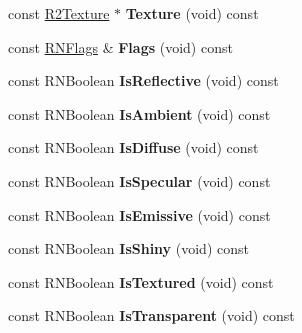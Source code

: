 \begin{DoxyCompactItemize}
\item 
const \hyperlink{class_r2_texture}{R2\+Texture} $\ast$ {\bfseries Texture} (void) const \hypertarget{class_r3_material_adb3b9725fc7ff3e0daf1f5e89dff8658}{}\label{class_r3_material_adb3b9725fc7ff3e0daf1f5e89dff8658}

\item 
const \hyperlink{class_r_n_flags}{R\+N\+Flags} \& {\bfseries Flags} (void) const \hypertarget{class_r3_material_a0348d7a761c37a72bcb7c214f095073b}{}\label{class_r3_material_a0348d7a761c37a72bcb7c214f095073b}

\item 
const R\+N\+Boolean {\bfseries Is\+Reflective} (void) const \hypertarget{class_r3_material_acf58b1ee4d1a08b066955d59c138cb70}{}\label{class_r3_material_acf58b1ee4d1a08b066955d59c138cb70}

\item 
const R\+N\+Boolean {\bfseries Is\+Ambient} (void) const \hypertarget{class_r3_material_a82a247481e72713014ac9f94fe27c7f7}{}\label{class_r3_material_a82a247481e72713014ac9f94fe27c7f7}

\item 
const R\+N\+Boolean {\bfseries Is\+Diffuse} (void) const \hypertarget{class_r3_material_a10a6578179e33218ffa010294fc1e88f}{}\label{class_r3_material_a10a6578179e33218ffa010294fc1e88f}

\item 
const R\+N\+Boolean {\bfseries Is\+Specular} (void) const \hypertarget{class_r3_material_a32a006663fe467228e13abf3c231383b}{}\label{class_r3_material_a32a006663fe467228e13abf3c231383b}

\item 
const R\+N\+Boolean {\bfseries Is\+Emissive} (void) const \hypertarget{class_r3_material_ac292d967e66c07b8e90881fab4cee70a}{}\label{class_r3_material_ac292d967e66c07b8e90881fab4cee70a}

\item 
const R\+N\+Boolean {\bfseries Is\+Shiny} (void) const \hypertarget{class_r3_material_ab747edeebfbe699fddcff4bed5ab70d3}{}\label{class_r3_material_ab747edeebfbe699fddcff4bed5ab70d3}

\item 
const R\+N\+Boolean {\bfseries Is\+Textured} (void) const \hypertarget{class_r3_material_ae747e8213c83acdb22a759e8ac510936}{}\label{class_r3_material_ae747e8213c83acdb22a759e8ac510936}

\item 
const R\+N\+Boolean {\bfseries Is\+Transparent} (void) const \hypertarget{class_r3_material_a7826c12b8a09baa641528d5e8f6baf9d}{}\label{class_r3_material_a7826c12b8a09baa641528d5e8f6baf9d}


\end{DoxyCompactItemize}
